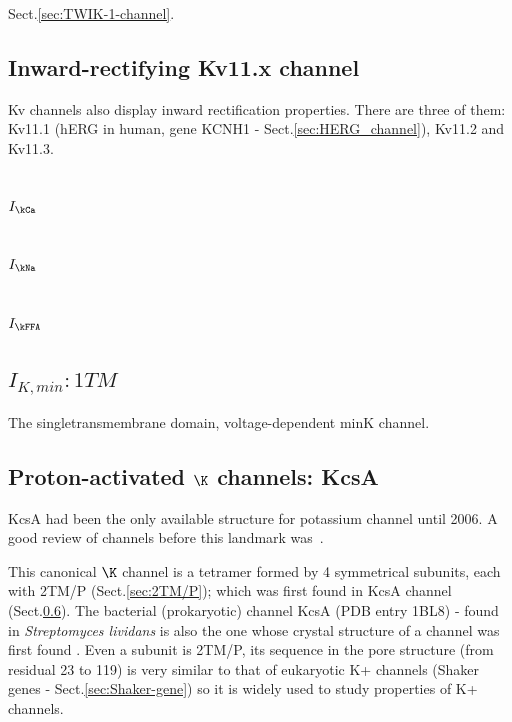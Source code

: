 Sect.\ref{sec:TWIK-1-channel}.

\subsection{Inward-rectifying Kv11.x channel}

Kv channels also display inward rectification properties. There are three of
them: Kv11.1 (hERG in human, gene KCNH1 - Sect.\ref{sec:HERG_channel}), Kv11.2 and
Kv11.3.

\subsection{$I_\kCa$}

\subsection{$I_\kNa$}

\subsection{$I_\kFFA$}


\subsection{$I_{K,min}: 1TM$}
\label{sec:IK_min-current}

The singletransmembrane domain, voltage-dependent minK channel.



\subsection{Proton-activated $\K$ channels: KcsA}
\label{sec:KcsA}

KcsA had been the only available structure for potassium channel until 2006.
A good review of  channels before this landmark
was~\citep{armstrong1998vic}.

This canonical $\K$ channel  is a tetramer formed by 4 symmetrical subunits,
each with 2TM/P (Sect.\ref{sec:2TM/P}); which was first found in KcsA channel
(Sect.\ref{sec:KcsA}).
The bacterial (prokaryotic) channel KcsA (PDB entry 1BL8) - found in {\it
Streptomyces lividans} is also the one whose crystal structure of a 
channel was first found \citep{doyle1998}. Even a subunit is 2TM/P, its sequence
in the pore structure (from residual 23 to 119) is very similar to that of
eukaryotic K+ channels (Shaker genes - Sect.\ref{sec:Shaker-gene}) so it is
widely used to study properties of K+ channels.

